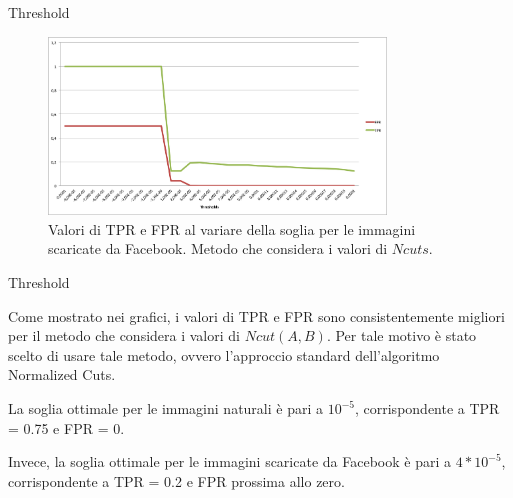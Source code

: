 \begin{tframe}{Threshold}

\begin{figure}[h]
\begin{center}
\includegraphics[width=0.8\textwidth]{../images/soglia_imgnat_fb_NC.png}
\end{center}
  \caption{Valori di TPR e FPR al variare della soglia per le immagini scaricate da Facebook. Metodo che considera i valori di $Ncuts$.}
\label{fig:soglia AC}
\end{figure}

\end{tframe}

\begin{tframe}{Threshold}

Come mostrato nei grafici, i valori di TPR e FPR sono consistentemente migliori per il metodo che considera i valori di $Ncut(A, B)$. Per tale motivo è stato scelto di usare tale metodo, ovvero l'approccio standard dell'algoritmo Normalized Cuts.

\vspace{0.2cm}

La soglia ottimale per le immagini naturali è pari a $10^{-5}$, corrispondente a TPR = 0.75 e FPR = 0.

\vspace{0.2cm}

Invece, la soglia ottimale per le immagini scaricate da Facebook è pari a $4*10^{-5}$, corrispondente a TPR = 0.2 e FPR prossima allo zero.

\end{tframe}


